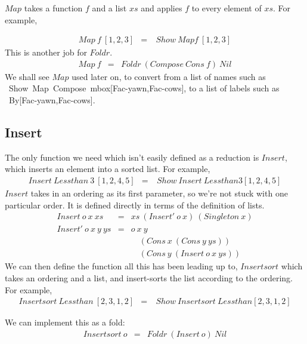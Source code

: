 $Map$ takes a function $f$ and a list $xs$ and applies $f$ to every
element of $xs$.  For example,

\begin{eqnarray*}
   Map~f~[1,2,3]  &  =  &  \ Show\ Map{f~}[1,2,3]
\end{eqnarray*}
This is another job for $Foldr$.
\begin{eqnarray*}
   Map~f  &  =  &  Foldr~(Compose~Cons~f)~Nil
\end{eqnarray*}
We shall see $Map$ used later on, to convert from a list of
names such as \ Show\ Map{\ Compose\  mbox\tt}[Fac-yawn,Fac-cows], to a list of 
labels such as \ By[Fac-yawn,Fac-cows].

\begin{teX}
\def\Map#1{\Foldr{\Compose\Cons{#1}}\Nil}
\end{teX}





\subsection{Insert}

The only function we need which isn't easily defined as a reduction
is $Insert$, which inserts an element into a sorted list.  For example,
\begin{eqnarray*}
   Insert~Lessthan~3~[1,2,4,5]  &  =  &  \ Show\ Insert\ Lessthan3[1,2,4,5]
\end{eqnarray*}
$Insert$ takes in an ordering as its first parameter, so we're not stuck
with one particular order.  It is defined directly in terms of the 
definition of lists.
\begin{eqnarray*}
      Insert~o~x~xs  &  =  &  xs~(Insert'~o~x)~(Singleton~x)  \\
   Insert'~o~x~y~ys  &  =  &  o~x~y  \\
                     &     &  \quad  (Cons~x~(Cons~y~ys))  \\
                     &     &  \quad  (Cons~y~(Insert~o~x~ys))
\end{eqnarray*}
We can then define the function all this has been leading up to,
$Insertsort$ which takes an ordering and a list, and insert-sorts the
list according to the ordering.  For example,
\begin{eqnarray*}
   Insertsort~Lessthan~[2,3,1,2]  &  =  &  \ Show\ Insertsort\ Lessthan[2,3,1,2]
\end{eqnarray*}

We can implement this as a fold:
\begin{eqnarray*}
   Insertsort~o  &  =  &  Foldr~(Insert~o)~Nil
\end{eqnarray*}

